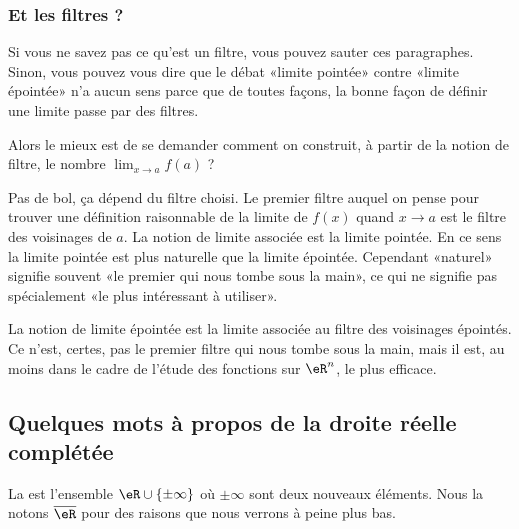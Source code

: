 \subsubsection{Et les filtres ?}

Si vous ne savez pas ce qu'est un filtre, vous pouvez sauter ces paragraphes. Sinon, vous pouvez vous dire que le débat «limite pointée» contre «limite épointée» n'a aucun sens parce que de toutes façons, la bonne façon de définir une limite passe par des filtres.

Alors le mieux est de se demander comment on construit, à partir de la notion de filtre, le nombre \( \lim_{x\to a} f(a)\) ?

Pas de bol, ça dépend du filtre choisi. Le premier filtre auquel on pense pour trouver une définition raisonnable de la limite de \( f(x)\) quand \( x\to a\) est le filtre des voisinages de \( a\). La notion de limite associée est la limite pointée. En ce sens la limite pointée est plus naturelle que la limite épointée. Cependant «naturel» signifie souvent «le premier qui nous tombe sous la main», ce qui ne signifie pas spécialement «le plus intéressant à utiliser».

La notion de limite épointée est la limite associée au filtre des voisinages épointés. Ce n'est, certes, pas le premier filtre qui nous tombe sous la main, mais il est, au moins dans le cadre de l'étude des fonctions sur \( \eR^n\), le plus efficace.

\subsection{Quelques mots à propos de la droite réelle complétée} 

\begin{definition}
    La  est l'ensemble \( \eR\cup\{ \pm \infty \}\) où \( \pm\infty\) sont deux nouveaux éléments. Nous la notons \( \overline{ \eR }\) pour des raisons que nous verrons à peine plus bas.
\end{definition}

